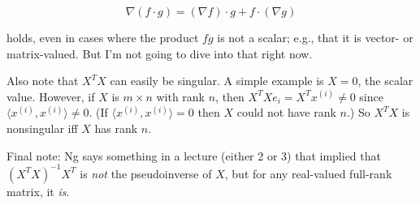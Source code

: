 \documentclass[]{article}
\begin{document}
\[\nabla(f\cdot g) = (\nabla f)\cdot g + f \cdot (\nabla g)\]

holds, even in cases where the product \(fg\) is not a scalar; e.g.,
that it is vector- or matrix-valued. But I'm not going to dive into that
right now.

Also note that \(X^TX\) can easily be singular. A simple example is
\(X=0\), the scalar value. However, if \(X\) is \(m\times n\) with rank
\(n\), then \(X^TXe_i = X^Tx^{(i)} \ne 0\) since
\(\langle x^{(i)}, x^{(i)}\rangle \ne 0.\) (If
\(\langle x^{(i)}, x^{(i)}\rangle = 0\) then \(X\) could not have rank
\(n.\)) So \(X^TX\) is nonsingular iff \(X\) has rank \(n\).

Final note: Ng says something in a lecture (either 2 or 3) that implied
that \((X^TX)^{-1}X^T\) is \emph{not} the pseudoinverse of \(X\), but
for any real-valued full-rank matrix, it \emph{is}.

\hypertarget{refs}{}
\end{document}
